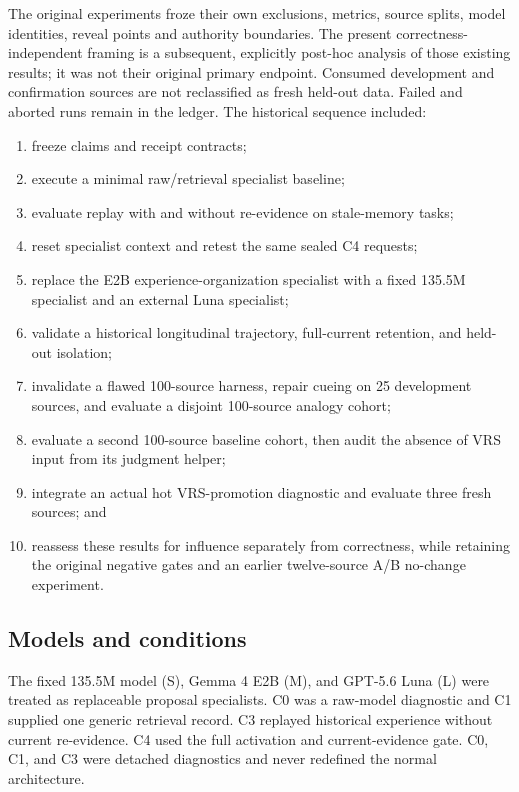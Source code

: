 \documentclass[11pt]{article}
\begin{document}
The original experiments froze their own exclusions, metrics, source splits, model identities, reveal points and authority boundaries. The present correctness-independent framing is a subsequent, explicitly post-hoc analysis of those existing results; it was not their original primary endpoint. Consumed development and confirmation sources are not reclassified as fresh held-out data. Failed and aborted runs remain in the ledger. The historical sequence included:
\begin{enumerate}[leftmargin=1.5em]
  \item freeze claims and receipt contracts;
  \item execute a minimal raw/retrieval specialist baseline;
  \item evaluate replay with and without re-evidence on stale-memory tasks;
  \item reset specialist context and retest the same sealed C4 requests;
  \item replace the E2B experience-organization specialist with a fixed 135.5M specialist and an external Luna specialist;
  \item validate a historical longitudinal trajectory, full-current retention, and held-out isolation;
  \item invalidate a flawed 100-source harness, repair cueing on 25 development sources, and evaluate a disjoint 100-source analogy cohort;
  \item evaluate a second 100-source baseline cohort, then audit the absence of VRS input from its judgment helper;
  \item integrate an actual hot VRS-promotion diagnostic and evaluate three fresh sources; and
  \item reassess these results for influence separately from correctness, while retaining the original negative gates and an earlier twelve-source A/B no-change experiment.
\end{enumerate}

\subsection{Models and conditions}

The fixed 135.5M model (S), Gemma 4 E2B (M), and GPT-5.6 Luna (L) were treated as replaceable proposal specialists.  C0 was a raw-model diagnostic and C1 supplied one generic retrieval record.  C3 replayed historical experience without current re-evidence.  C4 used the full activation and current-evidence gate.  C0, C1, and C3 were detached diagnostics and never redefined the normal architecture.
\end{document}

